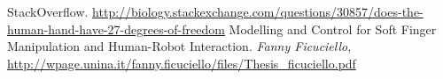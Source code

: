 \documentclass[12pt]{article}
\begin{document}
\begin{thebibliography}{9}

 StackOverflow. \url{http://biology.stackexchange.com/questions/30857/does-the-human-hand-have-27-degrees-of-freedom}
 Modelling and Control for Soft Finger Manipulation and Human-Robot Interaction. \textit{Fanny Ficuciello}, \url{http://wpage.unina.it/fanny.ficuciello/files/Thesis_ficuciello.pdf}
\end{thebibliography}

\end{document}
